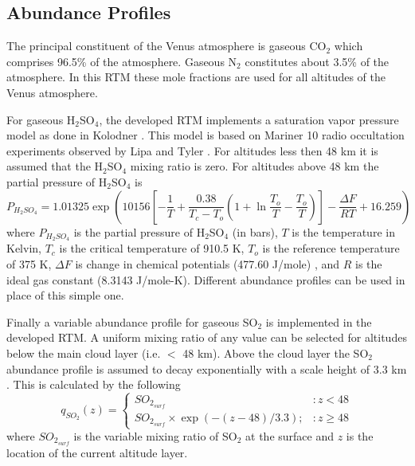 \subsection{Abundance Profiles}
The principal constituent of the Venus atmosphere is gaseous CO$_2$ which comprises 96.5\% of the atmosphere. Gaseous N$_2$ constitutes about 3.5\% of the atmosphere. In this RTM these mole fractions are used for all altitudes of the Venus atmosphere. 

For gaseous H$_2$SO$_4$, the developed RTM implements a saturation vapor pressure model as done in Kolodner \cite{Kolodner-thesis}. This model is based on Mariner 10 radio occultation experiments observed by Lipa and Tyler \cite{Lipa-1979}. For altitudes less then 48 km it is assumed that the H$_2$SO$_4$ mixing ratio is zero. For altitudes above 48 km the partial pressure of H$_2$SO$_4$ is
\begin{equation}
P_{H_2SO_4} = 1.01325\exp\left(10156\left[ -\frac{1}{T}+ \frac{0.38}{T_c-T_o}\left(1+\ln\frac{T_o}{T} - \frac{T_o}{T}\right) \right] - \frac{\Delta F}{R T} + 16.259 \right)
\end{equation}
where $P_{H_2SO_4}$ is the partial pressure of H$_2$SO$_4$ (in bars), $T$ is the temperature in Kelvin, $T_c$ is the critical temperature of 910.5 K, $T_o$ is the reference temperature of 375 K, $\Delta F$ is change in chemical potentials (477.60 J/mole) \cite{Giauque-1960}, and $R$ is the ideal gas constant (8.3143 J/mole-K). Different abundance profiles can be used in place of this simple one. %

Finally a variable abundance profile for gaseous SO$_2$ is implemented in the developed RTM. A uniform mixing ratio of any value can be selected for altitudes below the main cloud layer (i.e. $<$ 48 km). Above the cloud layer the SO$_2$ abundance profile is assumed to decay exponentially with a scale height of 3.3 km \cite{Na-1994}. This is calculated by the following
\begin{equation}
q_{SO_2}(z) = \left\{
     \begin{array}{lr}
       SO_{2_{surf}} & : z < 48\\
       SO_{2_{surf}}\times\exp(-(z-48)/3.3); & : z\geq 48
     \end{array}
   \right.
\end{equation}
where $SO_{2_{surf}}$ is the variable mixing ratio of SO$_2$ at the surface and $z$ is the location of the current altitude layer.


